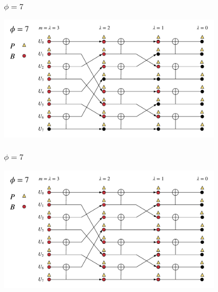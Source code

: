 \documentclass{beamer}
\begin{document}
\begin{frame}
\frametitle{$\phi=7$}
  \begin{center}
  \includegraphics[width=0.85\textwidth]{scl_pics/CalcP_7.png}
  \end{center}
\end{frame}

\begin{frame}
\frametitle{$\phi=7$}
  \begin{center}
  \includegraphics[width=0.85\textwidth]{scl_pics/UpdateB_7.png}
  \end{center}
\end{frame}
\end{document}
